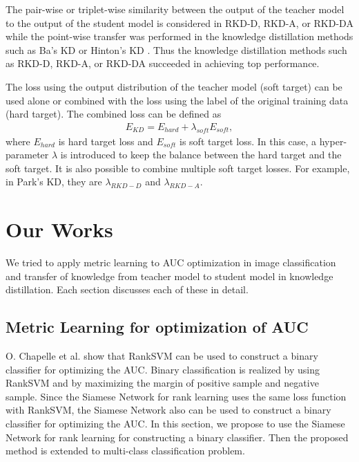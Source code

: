 \documentclass[a4paper,12pt]{article}
\begin{document}
The pair-wise or triplet-wise similarity between the output of the teacher model to the output of the student model is considered in RKD-D, RKD-A, or RKD-DA while the point-wise transfer was performed in the knowledge distillation methods such as Ba's KD \cite{Ba2014} or Hinton's KD \cite{Hinton2015}.
Thus the knowledge distillation methods such as RKD-D, RKD-A, or RKD-DA succeeded in achieving top performance.


The loss using the output distribution of the teacher model (soft target) can be used alone or combined with the loss using the label of the original training data (hard target).
The combined loss can be defined as
\begin{align} \label{eq:distillation loss}
E_{KD} = E_{hard} + \lambda_{soft} E_{soft},
\end{align}
where $E_{hard}$ is hard target loss and $E_{soft}$ is soft target loss.
In this case, a hyper-parameter $\lambda$ is introduced to keep the balance between the hard target and the soft target.
It is also possible to combine multiple soft target losses.
For example, in Park's KD, they are $\lambda_{RKD-D}$ and $\lambda_{RKD-A}$.



\section{Our Works}
We tried to apply metric learning to AUC optimization in image classification and transfer of knowledge from teacher model to student model in knowledge distillation.
Each section discusses each of these in detail.
\subsection{Metric Learning for optimization of AUC}
O. Chapelle et al. \cite{Chapelle2010} show that RankSVM can be used to construct a binary classifier for optimizing the AUC.
Binary classification is realized by using RankSVM and by maximizing the margin of positive sample and negative sample. 
Since the Siamese Network for rank learning uses the same loss function with RankSVM,
the Siamese Network also can be used to construct a binary classifier for optimizing the AUC.
In this section, we propose to use the Siamese Network for rank learning for constructing a binary classifier.
Then the proposed method is extended to multi-class classification problem.
\clearpage
\end{document}
